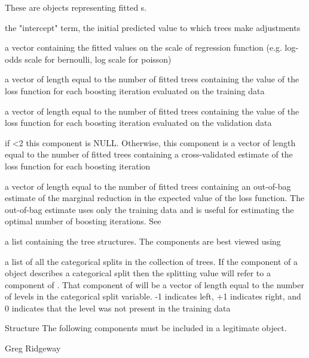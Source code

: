 \documentclass{article}
\begin{document}
\begin{Description}\relax
These are objects representing fitted s.
\end{Description}
\begin{Value}
\begin{ldescription}
\item[\code{initF}] the "intercept" term, the initial predicted value to which trees
make adjustments
\item[\code{fit}] a vector containing the fitted values on the scale of regression
function (e.g. log-odds scale for bernoulli, log scale for poisson)
\item[\code{train.error}] a vector of length equal to the number of fitted trees
containing the value of the loss function for each boosting iteration
evaluated on the training data
\item[\code{valid.error}] a vector of length equal to the number of fitted trees
containing the value of the loss function for each boosting iteration
evaluated on the validation data
\item[\code{cv.error}] if <2 this component is NULL. Otherwise, this 
component is a vector of length equal to the number of fitted trees
containing a cross-validated estimate of the loss function for each boosting 
iteration
\item[\code{oobag.improve}] a vector of length equal to the number of fitted trees
containing an out-of-bag estimate of the marginal reduction in the expected
value of the loss function. The out-of-bag estimate uses only the training
data and is useful for estimating the optimal number of boosting iterations.
See 
\item[\code{trees}] a list containing the tree structures. The components are best
viewed using 
\item[\code{c.splits}] a list of all the categorical splits in the collection of
trees. If the  component of a  object describes a
categorical split then the splitting value will refer to a component of
. That component of  will be a vector of length
equal to the number of levels in the categorical split variable. -1 indicates
left, +1 indicates right, and 0 indicates that the level was not present in the
training data
\end{ldescription}
\end{Value}
\begin{Section}{Structure}
The following components must be included in a legitimate  object.
\end{Section}
\begin{Author}\relax
Greg Ridgeway 
\end{Author}
\begin{SeeAlso}\relax
{}
\end{SeeAlso}
\end{document}
